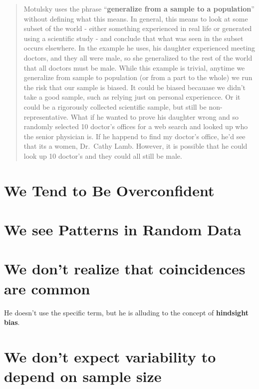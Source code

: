 \documentclass[]{book}
\theoremstyle{definition}
\theoremstyle{definition}
\theoremstyle{definition}
\theoremstyle{remark}
\begin{document}
\begin{quote}
Motulsky uses the phrase ``\textbf{generalize from a sample to a
population}'' without defining what this means. In general, this means
to look at some subset of the world - either something experienced in
real life or generated using a scientific study - and conclude that what
was seen in the subset occurs elsewhere. In the example he uses, his
daughter experienced meeting doctors, and they all were male, so she
generalized to the rest of the world that all doctors must be male.
While this example is trivial, anytime we generalize from sample to
population (or from a part to the whole) we run the risk that our sample
is biased. It could be biased becauase we didn't take a good sample,
such as relying just on personal experiencce. Or it could be a
rigorously collected scientific sample, but still be non-representative.
What if he wanted to prove his daughter wrong and so randomly selected
10 doctor's offices for a web search and looked up who the senior
physician is. If he happend to find my doctor's office, he'd see that
its a women, Dr.~Cathy Lamb. However, it is possible that he could look
up 10 doctor's and they could all still be male.
\end{quote}

\section{We Tend to Be Overconfident}\label{we-tend-to-be-overconfident}

\section{We see Patterns in Random
Data}\label{we-see-patterns-in-random-data}

\section{We don't realize that coincidences are
common}\label{we-dont-realize-that-coincidences-are-common}

He doesn't use the specific term, but he is alluding to the concept of
\textbf{hindsight bias}.

\section{We don't expect variability to depend on sample
size}\label{we-dont-expect-variability-to-depend-on-sample-size}
\end{document}
